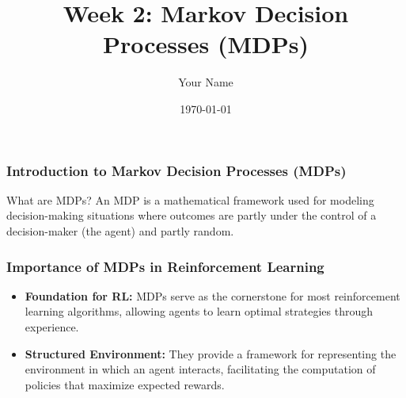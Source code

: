 \documentclass{beamer}
\title{Week 2: Markov Decision Processes (MDPs)}
\author{Your Name}
\institute{Your Institution}
\date{\today}
\begin{document}
\frame{\titlepage}

\begin{frame}[fragile]
    \frametitle{Introduction to Markov Decision Processes (MDPs)}
    \begin{block}{What are MDPs?}
        An MDP is a mathematical framework used for modeling decision-making situations where outcomes are partly under the control of a decision-maker (the agent) and partly random.
    \end{block}
\end{frame}

\begin{frame}[fragile]
    \frametitle{Importance of MDPs in Reinforcement Learning}
    \begin{itemize}
        \item \textbf{Foundation for RL:} MDPs serve as the cornerstone for most reinforcement learning algorithms, allowing agents to learn optimal strategies through experience.
        \item \textbf{Structured Environment:} They provide a framework for representing the environment in which an agent interacts, facilitating the computation of policies that maximize expected rewards.
    \end{itemize}
\end{frame}
\end{document}
